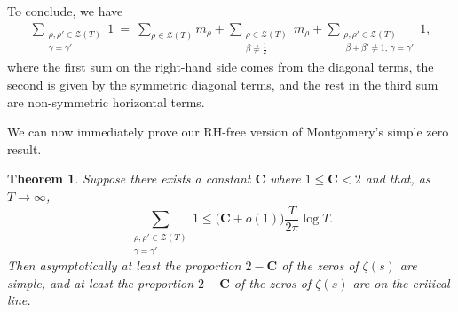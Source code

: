 \documentclass[11pt]{amsart}
\newtheorem{theorem}{Theorem}%
\theoremstyle{remark}
\theoremstyle{plain}
\numberwithin{equation}{section}
\begin{document}
To conclude, we have
\begin{align} \label{key}
\sum_{\substack{\rho,\rho' \in \mathcal{Z}(T)\\ \gamma=\gamma'}} 1 \ = \
\sum_{\rho \in \mathcal{Z}(T)}m_{\rho}
+
\sum_{\substack{\rho \in \mathcal{Z}(T)\\ \beta \neq \frac{1}{2}}}m_{\rho}
+
\sum_{\substack{\rho,\rho' \in \mathcal{Z}(T)\\ \ \beta+\beta' \neq 1,\, \gamma = \gamma'}} 1,
\end{align}
where the first sum on the right-hand side comes from the diagonal terms, the second is given by the symmetric diagonal terms, and the rest in the third sum are non-symmetric horizontal terms.

We can now immediately prove our RH-free version of Montgomery's simple zero result.

\begin{theorem} \label{thm2} Suppose there exists a constant $\mathbf{C}$ where $1\le\mathbf{C}<2$ and that, as $T\to \infty$, 
\begin{equation} \label{thm2input}
\sum_{\substack{\rho,\rho' \in \mathcal{Z}(T) \\ \gamma=\gamma'}} 1 \le \Big(\mathbf{C}+o(1)\Big)\frac{T}{2\pi}\log{T}.
\end{equation}
Then asymptotically at least the proportion $2-\mathbf{C}$ of the zeros of $\zeta(s)$ are simple, and at least the proportion $2-\mathbf{C}$ of the zeros of $\zeta(s)$ are on the critical line. 
\end{theorem}


\end{document}
